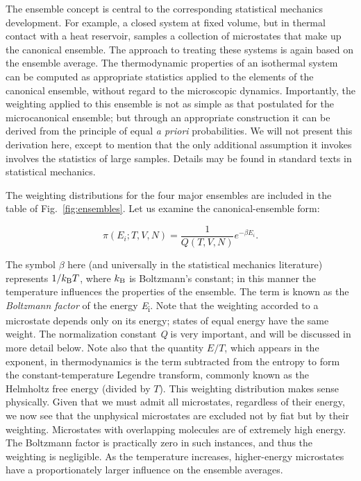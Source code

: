 \documentclass[9pt,bestpractices]{molsim}
\begin{document}
The ensemble concept is central to the corresponding statistical
mechanics development. For example, a closed system at fixed volume, but
in thermal contact with a heat reservoir, samples a collection of
microstates that make up the canonical ensemble. The approach to
treating these systems is again based on the ensemble average. The
thermodynamic properties of an isothermal system can be computed as
appropriate statistics applied to the elements of the canonical
ensemble, without regard to the microscopic dynamics. Importantly, the
weighting applied to this ensemble is not as simple as that postulated
for the microcanonical ensemble; but through an appropriate construction
it can be derived from the principle of equal \emph{a priori}
probabilities. We will not present this derivation here, except to
mention that the only additional assumption it invokes involves the
statistics of large samples. Details may be found in standard texts in
statistical mechanics.

The weighting distributions for the four major ensembles are included in
the table of Fig.~\ref{fig:ensembles}. Let us examine the canonical-ensemble form:

\[\pi \left( {{E_i};T,V,N} \right) = \frac{1}{{Q(T,V,N)}}{e^{ - \beta {E_i}}}.\]

The symbol $\beta$ here (and universally in the statistical mechanics
literature) represents $1/k_{\rm B}T$, where $k_{\rm B}$ is Boltzmann's constant; in this
manner the temperature influences the properties of the ensemble. The
term is known as the \emph{Boltzmann factor} of the energy
\emph{E}\textsubscript{i}. Note that the weighting accorded to a
microstate depends only on its energy; states of equal energy have the
same weight. The normalization constant \emph{Q} is very important, and
will be discussed in more detail below. Note also that the quantity $E/T$,
which appears in the exponent, in thermodynamics is the term subtracted
from the entropy to form the constant-temperature Legendre transform,
commonly known as the Helmholtz free energy (divided by $T$). This
weighting distribution makes sense physically. Given that we must admit
all microstates, regardless of their energy, we now see that the
unphysical microstates are excluded not by fiat but by their weighting.
Microstates with overlapping molecules are of extremely high energy. The
Boltzmann factor is practically zero in such instances, and thus the
weighting is negligible. As the temperature increases, higher-energy
microstates have a proportionately larger influence on the ensemble
averages.
\end{document}
